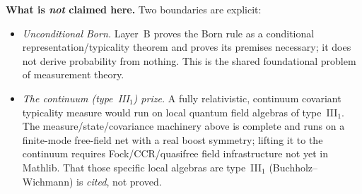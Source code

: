 \noindent\textbf{What is \emph{not} claimed here.} Two boundaries are explicit:
\begin{itemize}
  \item \emph{Unconditional Born.} Layer~B proves the Born rule as a conditional
        representation/typicality theorem and proves its premises necessary; it does
        not derive probability from nothing. This is the shared foundational problem
        of measurement theory.
  \item \emph{The continuum (type~III$_1$) prize.} A fully relativistic, continuum
        covariant typicality measure would run on local quantum field algebras of
        type~III$_1$. The measure/state/covariance machinery above is complete and
        runs on a finite-mode free-field net with a real boost symmetry; lifting it to
        the continuum requires Fock/CCR/quasifree field infrastructure not yet in
        Mathlib. That those specific local algebras are type~III$_1$
        (Buchholz--Wichmann) is \emph{cited}, not proved.
\end{itemize}

